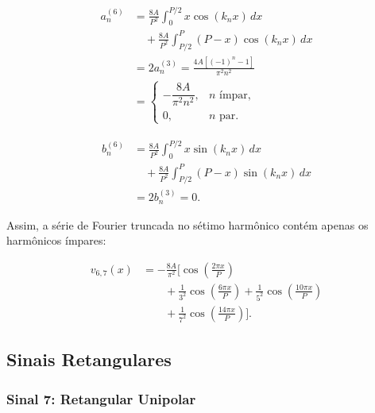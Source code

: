 \begin{equation}
    \begin{aligned}
        a_n^{(6)} &= \frac{8A}{P^2}\int_0^{P/2}x\cos(k_nx)\,dx \\
            &\quad {}+ \frac{8A}{P^2}\int_{P/2}^P
            (P-x)\cos(k_nx)\,dx \\
            &= 2a_n^{(3)} = \frac{4A\left[(-1)^n-1\right]}{\pi^2n^2} \\
            &= \begin{cases}
                -\dfrac{8A}{\pi^2n^2}, & n\text{ ímpar}, \\[4pt]
                0, & n\text{ par}.
            \end{cases}
    \end{aligned}
\end{equation}

\begin{equation}
    \begin{aligned}
        b_n^{(6)} &= \frac{8A}{P^2}\int_0^{P/2}x\sin(k_nx)\,dx \\
            &\quad {}+ \frac{8A}{P^2}\int_{P/2}^P
            (P-x)\sin(k_nx)\,dx \\
            &= 2b_n^{(3)} = 0.
    \end{aligned}
\end{equation}

Assim, a série de Fourier truncada no sétimo harmônico contém apenas
os harmônicos ímpares:

\begin{equation}
    \begin{aligned}
        v_{6,7}(x) &= -\frac{8A}{\pi^2}\biggl[
            \cos\left(\frac{2\pi x}{P}\right) \\
            &\qquad {}+ \frac{1}{3^2}\cos\left(\frac{6\pi x}{P}\right)
             + \frac{1}{5^2}\cos\left(\frac{10\pi x}{P}\right) \\
            &\qquad {}+ \frac{1}{7^2}\cos\left(\frac{14\pi x}{P}\right)\biggr].
    \end{aligned}
\end{equation}

\subsection{Sinais Retangulares}
\subsubsection{Sinal 7: Retangular Unipolar}

